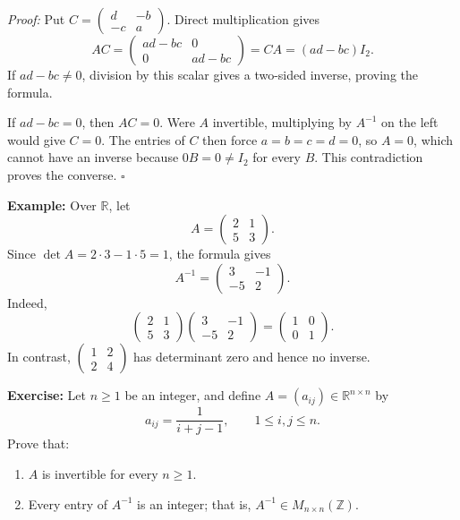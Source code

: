 \documentclass[a4paper,11pt,abstract=true]{scrartcl}
\theoremstyle{dotlessP}
\theoremstyle{dotlessS}
\theoremstyle{remark}
\theoremstyle{definition}
\begin{document}
\begin{claim_box}
\textit{Proof:} Put $C=\begin{pmatrix}d&-b\\-c&a\end{pmatrix}$.
Direct multiplication gives
\[
AC=\begin{pmatrix}ad-bc&0\\0&ad-bc\end{pmatrix}
=CA=(ad-bc)I_2.
\]
If $ad-bc\neq0$, division by this scalar gives a two-sided inverse,
proving the formula.

If $ad-bc=0$, then $AC=0$. Were $A$ invertible, multiplying by
$A^{-1}$ on the left would give $C=0$. The entries of $C$ then force
$a=b=c=d=0$, so $A=0$, which cannot have an inverse because $0B=0\neq I_2$
for every $B$. This contradiction proves the converse. \hfill$\square$
\end{claim_box}

\begin{example_box}
\textbf{Example:} Over
$\mathbb{R}$, let
\[
A=\begin{pmatrix}2&1\\5&3\end{pmatrix}.
\]
Since $\det A=2\cdot3-1\cdot5=1$, the formula gives
\[
A^{-1}=\begin{pmatrix}3&-1\\-5&2\end{pmatrix}.
\]
Indeed,
\[
\begin{pmatrix}2&1\\5&3\end{pmatrix}
\begin{pmatrix}3&-1\\-5&2\end{pmatrix}
=\begin{pmatrix}1&0\\0&1\end{pmatrix}.
\]
In contrast, $\begin{pmatrix}1&2\\2&4\end{pmatrix}$ has determinant
zero and hence no inverse.
\end{example_box}

\begin{problem_box}
\textbf{Exercise:}
Let $n\geq1$ be an integer, and define $A=(a_{ij})\in\mathbb{R}^{n\times n}$
by
\[
a_{ij}=\frac{1}{i+j-1},\qquad 1\leq i,j\leq n.
\]
Prove that:
\begin{enumerate}
    \item $A$ is invertible for every $n\geq1$.
    \item Every entry of $A^{-1}$ is an integer; that is,
    $A^{-1}\in M_{n\times n}(\mathbb{Z})$.
\end{enumerate}
\end{problem_box}
\end{document}
